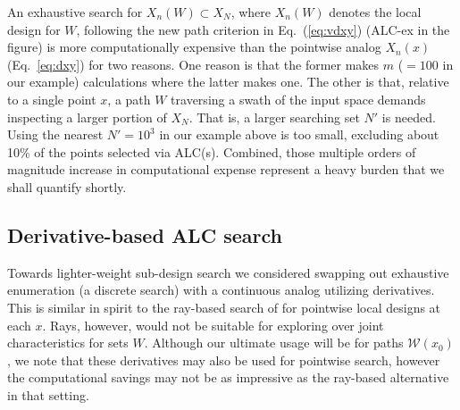 \documentclass[12pt]{article}
\begin{document}
An exhaustive search for $X_n(W) \subset X_N$, where $X_n(W)$ denotes
the local design for $W$, following the new path criterion in
Eq.~(\ref{eq:vdxy}) (ALC-ex in the figure) is more computationally expensive
than the pointwise analog $X_n(x)$ (Eq.~\ref{eq:dxy}) for two reasons.  One
reason is that the former makes $m$ ($=100$ in our example) calculations where
the latter makes one. The other is that, relative to a single point $x$,  a
path $W$ traversing a swath of the input space demands inspecting a larger
portion of $X_N$.  That is, a larger searching set $N'$ is needed. Using
the nearest $N'=10^3$ in our example above is too
small, excluding about 10\% of the points selected via ALC(s). Combined,
those multiple orders of magnitude increase in computational expense represent
a heavy burden that we shall quantify shortly.

\subsection{Derivative-based ALC search}
\label{sec:dalc}

Towards lighter-weight sub-design search we considered swapping out exhaustive
enumeration (a discrete search) with a continuous analog utilizing
derivatives.  This is similar in spirit to the ray-based search of
\citet{gramacy:haaland:2015} for pointwise local designs at each $x$.  Rays,
however, would not be suitable for exploring over joint characteristics for
sets $W$.  Although our ultimate usage will be for paths $\mathcal{W}(x_0)$,
we note that these derivatives may also be used for pointwise search, however
the computational savings may not be as impressive as the ray-based
alternative in that setting.
\end{document}

